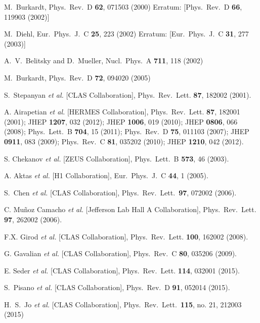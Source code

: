 \documentclass[nofootinbib,twocolumn,showpacs,prl,superscriptaddress,secnumarabic,amssymb,nobibnotes,aps,floatfix]{revtex4}
\begin{document}
\begin{thebibliography}{99}

  M.~Burkardt,
  Phys.\ Rev.\ D {\bf 62}, 071503 (2000)
  Erratum: [Phys.\ Rev.\ D {\bf 66}, 119903 (2002)]

  M.~Diehl,
  Eur.\ Phys.\ J.\ C {\bf 25}, 223 (2002)
  Erratum: [Eur.\ Phys.\ J.\ C {\bf 31}, 277 (2003)]
 
  A.~V.~Belitsky and D.~Mueller,
  Nucl.\ Phys.\ A {\bf 711}, 118 (2002)

  M.~Burkardt,
  Phys.\ Rev.\ D {\bf 72}, 094020 (2005)

S.~Stepanyan {\it et al.} [CLAS Collaboration],
Phys.\ Rev.\ Lett. {\bf 87}, 182002 (2001).

A. Airapetian {\it et al.} [HERMES Collaboration],
Phys.\ Rev.\ Lett. {\bf 87}, 182001 (2001);
JHEP {\bf 1207}, 032 (2012);
JHEP {\bf 1006}, 019 (2010);
JHEP {\bf 0806}, 066 (2008);
Phys.\ Lett.\ B {\bf 704}, 15 (2011);
Phys.\ Rev.\  D {\bf 75}, 011103 (2007);
JHEP {\bf 0911}, 083 (2009);
Phys.\ Rev.\ C {\bf 81}, 035202 (2010);
JHEP {\bf 1210}, 042 (2012).

S. Chekanov {\it et al.} [ZEUS Collaboration],
Phys.\ Lett.\  B {\bf 573}, 46 (2003).

A. Aktas {\it et al.} [H1 Collaboration],
Eur.\ Phys.\ J.\ C {\bf 44}, 1 (2005).

S.~Chen {\it et al.} [CLAS Collaboration],
Phys.\ Rev.\ Lett.\ {\bf 97}, 072002 (2006).

C. Mu\~noz Camacho {\it et al.} [Jefferson Lab Hall A Collaboration],
Phys.\ Rev.\ Lett. {\bf 97}, 262002 (2006).

F.X. Girod {\it et al.} [CLAS Collaboration],
Phys.\ Rev.\ Lett. {\bf 100}, 162002 (2008).

G. Gavalian {\it et al.} [CLAS Collaboration],
Phys.\ Rev.\ C {\bf 80}, 035206 (2009).

E. Seder {\it et al.} [CLAS Collaboration],
Phys.\ Rev.\ Lett. {\bf 114}, 032001 (2015).

S.~Pisano {\it et al.} [CLAS Collaboration],
Phys.\ Rev.\ D {\bf 91}, 052014 (2015).

 H.~S.~Jo {\it et al.} [CLAS Collaboration],
  Phys.\ Rev.\ Lett.\  {\bf 115}, no. 21, 212003 (2015)


\end{thebibliography}
\end{document}

